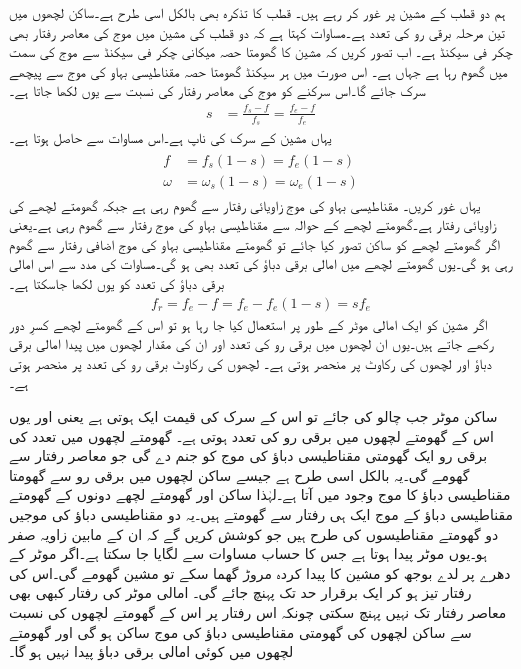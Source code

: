 ہم دو قطب کے مشین پر غور کر رہے ہیں۔ قطب کا تذکرہ بھی بالکل اسی طرح ہے۔ساکن لچھوں میں تین مرحلہ برقی رو کی تعدد  ہے۔مساوات   کہتا ہے کہ دو قطب کی مشین میں موج کی معاصر رفتار بھی  چکر فی سیکنڈ ہے۔ اب تصور کریں کہ مشین کا گھومتا حصہ  میکانی چکر فی سیکنڈ سے موج کی سمت میں گھوم رہا ہے جہاں  ہے۔ اس صورت میں ہر سیکنڈ گھومتا حصہ مقناطیسی بہاو کی موج سے پیچھے سرک جائے گا۔اس سرکنے کو موج کی معاصر رفتار کی نسبت سے یوں لکھا جاتا ہے۔
\begin{align}
s&=\frac{f_s-f}{f_s}=\frac{f_e-f}{f_e}
\end{align}
یہاں  مشین کے سرک کی ناپ ہے۔اس مساوات سے حاصل ہوتا ہے۔
\begin{gather}
\begin{aligned}\label{مساوات_امالی_سرک_اور_تعدد}
f&=f_s (1-s)=f_e(1-s)\\
\omega&=\omega_s(1-s)=\omega_e(1-s)
\end{aligned}
\end{gather}
یہاں غور کریں۔ مقناطیسی بہاو کی موج  زاویائی رفتار سے گھوم رہی ہے جبکہ  گھومتے لچھے کی زاویائی رفتار  ہے۔گھومتے لچھے کے حوالہ سے مقناطیسی بہاو کی موج  رفتار سے گھوم رہی ہے۔یعنی اگر گھومتے لچھے کو ساکن تصور کیا جائے تو گھومتے مقناطیسی بہاو کی موج  اضافی رفتار سے گھوم رہی ہو گی۔یوں گھومتے لچھے میں امالی برقی دباؤ کی تعدد بھی  ہو گی۔مساوات   کی مدد سے اس امالی برقی دباؤ کی تعدد  کو یوں لکھا جاسکتا ہے۔
\begin{align}\label{مساوات_امالی-سرک_تعلق_ب}
f_r=f_e-f=f_e-f_e(1-s)=s f_e
\end{align}
اگر مشین کو ایک امالی موٹر کے طور پر استعمال کیا جا رہا ہو تو اس کے گھومتے لچھے کسرِ دور رکھے جاتے ہیں۔یوں ان لچھوں میں برقی رو کی تعدد  اور ان کی مقدار لچھوں میں پیدا امالی برقی دباؤ اور لچھوں کی رکاوٹ پر منحصر ہوتی ہے۔ لچھوں کی رکاوٹ برقی رو کی تعدد پر منحصر ہوتی ہے۔

ساکن موٹر جب چالو کی جائے تو اس کے سرک  کی قیمت  ایک ہوتی ہے یعنی  اور یوں اس کے گھومتے لچھوں میں برقی رو کی تعدد  ہوتی ہے۔ گھومتے لچھوں میں   تعدد کی برقی رو ایک گھومتی مقناطیسی دباؤ کی موج کو جنم دے گی جو معاصر رفتار سے گھومے گی۔یہ بالکل اسی طرح ہے جیسے ساکن لچھوں میں برقی رو سے گھومتا مقناطیسی دباؤ کا موج وجود میں آتا ہے۔لہٰذا ساکن اور گھومتے لچھے دونوں کے گھومتے مقناطیسی دباؤ کے موج ایک ہی رفتار سے گھومتے ہیں۔یہ دو مقناطیسی دباؤ کی موجیں دو گھومتے مقناطیسوں کی طرح ہیں جو کوشش کریں گے کہ ان کے مابین زاویہ صفر ہو۔یوں موٹر  پیدا ہوتا ہے جس کا حساب  مساوات  سے لگایا جا سکتا ہے۔اگر موٹر کے دھرے پر لدے بوجھ کو مشین کا پیدا کردہ مروڑ گھما سکے تو مشین گھومے گی۔اس کی رفتار تیز ہو کر ایک برقرار حد تک پہنچ جائے گی۔ امالی موٹر کی رفتار کبھی بھی معاصر رفتار تک نہیں پہنچ سکتی چونکہ اس رفتار پر اس کے گھومتے لچھوں کی نسبت سے ساکن لچھوں کی گھومتی مقناطیسی دباؤ کی موج ساکن ہو گی اور گھومتے لچھوں میں کوئی امالی برقی دباؤ پیدا نہیں ہو گا۔


